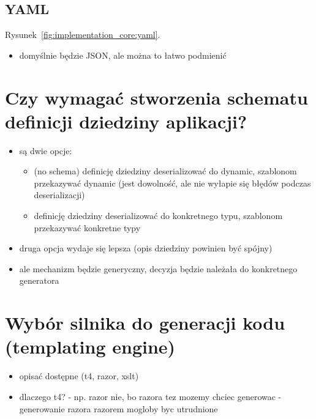 


\subsection{YAML}

Rysunek~\ref{fig:implementation_core:yaml}.




\begin{itemize}
 \item domyślnie będzie JSON, ale można to łatwo podmienić
\end{itemize}



\section{Czy wymagać stworzenia schematu definicji dziedziny aplikacji?} \label{sec:core:domain_schema_requirement}

\begin{itemize}
 \item są dwie opcje:
  \begin{itemize}
   \item (no schema) definicję dziedziny deserializować do dynamic, szablonom przekazywać dynamic (jest dowolność, ale nie wyłapie się błędów podczas deserializacji)
   \item definicję dziedziny deserializować do konkretnego typu, szablonom przekazywać konkretne typy
  \end{itemize}
 \item druga opcja wydaje się lepsza (opis dziedziny powinien być spójny)
 \item ale mechanizm będzie generyczny, decyzja będzie należała do konkretnego generatora
\end{itemize}



\section{Wybór silnika do generacji kodu (templating engine)} \label{sec:core:templating_engine}

\begin{itemize}
 \item opisać dostępne (t4, razor, xslt)
 \item dlaczego t4? - np. razor nie, bo razora tez mozemy chciec generowac - generowanie razora razorem mogloby byc utrudnione
\end{itemize}
